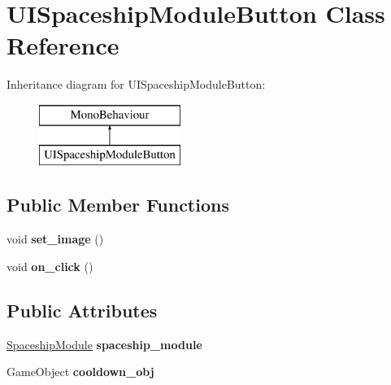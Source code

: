 \hypertarget{class_u_i_spaceship_module_button}{}\section{U\+I\+Spaceship\+Module\+Button Class Reference}
\label{class_u_i_spaceship_module_button}
Inheritance diagram for U\+I\+Spaceship\+Module\+Button\+:\begin{figure}[H]
\begin{center}
\leavevmode
\includegraphics[height=2.000000cm]{class_u_i_spaceship_module_button}
\end{center}
\end{figure}
\subsection*{Public Member Functions}
\begin{DoxyCompactItemize}
\item 
\mbox{\label{class_u_i_spaceship_module_button_a07e55aa2d05fed404f7ab050ebba10d8}} 
void {\bfseries set\+\_\+image} ()
\item 
\mbox{\label{class_u_i_spaceship_module_button_afc4055c52ebc5e1c3138cb9bd26cf05d}} 
void {\bfseries on\+\_\+click} ()
\end{DoxyCompactItemize}
\subsection*{Public Attributes}
\begin{DoxyCompactItemize}
\item 
\mbox{\label{class_u_i_spaceship_module_button_ae20ec3f12f2e37061817994cff63f8ce}} 
\hyperlink{class_spaceship_module}{Spaceship\+Module} {\bfseries spaceship\+\_\+module}
\item 
\mbox{\label{class_u_i_spaceship_module_button_a2ad240dd428f86551cf7301dd4898660}} 
Game\+Object {\bfseries cooldown\+\_\+obj}
\end{DoxyCompactItemize}
